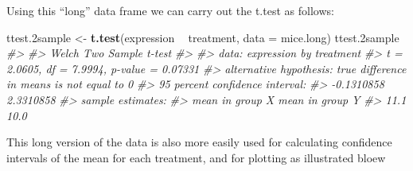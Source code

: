 \documentclass[]{book}
\newenvironment{Shaded}{\begin{snugshade}}{\end{snugshade}}
\newcommand{\CommentTok}[1]{\textcolor[rgb]{0.56,0.35,0.01}{\textit{#1}}}
\newcommand{\DataTypeTok}[1]{\textcolor[rgb]{0.13,0.29,0.53}{#1}}
\newcommand{\FloatTok}[1]{\textcolor[rgb]{0.00,0.00,0.81}{#1}}
\newcommand{\KeywordTok}[1]{\textcolor[rgb]{0.13,0.29,0.53}{\textbf{#1}}}
\newcommand{\NormalTok}[1]{#1}
\newcommand{\OperatorTok}[1]{\textcolor[rgb]{0.81,0.36,0.00}{\textbf{#1}}}
\newcommand{\StringTok}[1]{\textcolor[rgb]{0.31,0.60,0.02}{#1}}
\theoremstyle{definition}
\theoremstyle{definition}
\theoremstyle{definition}
\theoremstyle{remark}
\begin{document}
\begin{Shaded}
\end{Shaded}

Using this ``long'' data frame we can carry out the t.test as follows:

\begin{Shaded}
\begin{Highlighting}[]
\NormalTok{ttest}\FloatTok{.2}\NormalTok{sample <-}\StringTok{ }\KeywordTok{t.test}\NormalTok{(expression }\OperatorTok{~}\StringTok{ }\NormalTok{treatment, }\DataTypeTok{data =}\NormalTok{ mice.long)}
\NormalTok{ttest}\FloatTok{.2}\NormalTok{sample}
\CommentTok{#> }
\CommentTok{#>  Welch Two Sample t-test}
\CommentTok{#> }
\CommentTok{#> data:  expression by treatment}
\CommentTok{#> t = 2.0605, df = 7.9994, p-value = 0.07331}
\CommentTok{#> alternative hypothesis: true difference in means is not equal to 0}
\CommentTok{#> 95 percent confidence interval:}
\CommentTok{#>  -0.1310858  2.3310858}
\CommentTok{#> sample estimates:}
\CommentTok{#> mean in group X mean in group Y }
\CommentTok{#>            11.1            10.0}
\end{Highlighting}
\end{Shaded}

This long version of the data is also more easily used for calculating
confidence intervals of the mean for each treatment, and for plotting as
illustrated bloew
\end{document}
